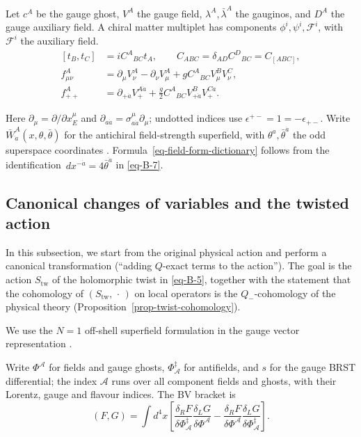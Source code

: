 \documentclass[11pt]{article}
\numberwithin{equation}{section}
\numberwithin{figure}{section}
\numberwithin{table}{section}
\begin{document}
Let $c^A$ be the gauge ghost, $V^A$ the gauge field, $\lambda^A,\bar\lambda^A$ the gauginos, and $D^A$ the gauge auxiliary field. A chiral matter multiplet has components $\phi^i,\psi^i,\mathcal F^i$, with $\mathcal F^i$ the auxiliary field.
\begin{equation}\label{b-00894}
\begin{aligned}
[t_B,t_C]&=iC^A{}_{BC}t_A,\qquad
C_{ABC}=\delta_{AD}C^D{}_{BC}=C_{[ABC]},\\
f_{\mu\nu}^A&=\partial_\mu V_\nu^A-\partial_\nu V_\mu^A
+gC^A{}_{BC}V_\mu^BV_\nu^C,\\
f_{++}^A&=\partial_{+\dot a}V_+^{A\dot a}
+\frac g2C^A{}_{BC}V_{+\dot a}^BV_+^{C\dot a}.
\end{aligned}
\end{equation}

Here $\partial_\mu=\partial/\partial x_E^\mu$ and $\partial_{a\dot a}=\sigma^\mu_{a\dot a}\partial_\mu$; undotted indices use $\epsilon^{+-}=1=-\epsilon_{+-}$. Write $\bar W_{\dot a}^A(x,\theta,\bar\theta)$ for the antichiral field-strength superfield, with $\theta^a,\bar\theta^{\dot a}$ the odd superspace coordinates \cite[Eqs.~(27.2.12), (27.3.16)]{Weinberg}. Formula~\eqref{eq-field-form-dictionary} follows from the identification~$dx^{-\dot a}=4\bar\theta^{\dot a}$ in \eqref{eq-B-7}.

\subsection{Canonical changes of variables and the twisted action}\label{canonical-changes-of-variables}

In this subsection, we start from the original physical action and perform a canonical transformation (``adding $Q$-exact terms to the action''). The goal is the action $S_{\mathrm{tw}}$ of the holomorphic twist in \eqref{eq-B-5}, together with the statement that the cohomology of $(S_{\mathrm{tw}},\,\cdot\,)$ on local operators is the $Q_-$-cohomology of the physical theory (Proposition~\ref{prop-twist-cohomology}).

We use the $N=1$ off-shell superfield formulation in the gauge vector representation \cite[Chapters 26--27]{Weinberg}.

Write $\Phi^{\mathcal A}$ for fields and gauge ghosts, $\Phi^\ddagger_{\mathcal A}$ for antifields, and $s$ for the gauge BRST differential; the index $\mathcal A$ runs over all component fields and ghosts, with their Lorentz, gauge and flavour indices. The BV bracket is
\begin{equation}\label{eq-A-8}
(F,G)=\int d^4x\left[
\frac{\delta_RF}{\delta\Phi^\ddagger_{\mathcal A}}
\frac{\delta_LG}{\delta\Phi^{\mathcal A}}
-\frac{\delta_RF}{\delta\Phi^{\mathcal A}}
\frac{\delta_LG}{\delta\Phi^\ddagger_{\mathcal A}}\right].
\end{equation}
\end{document}
